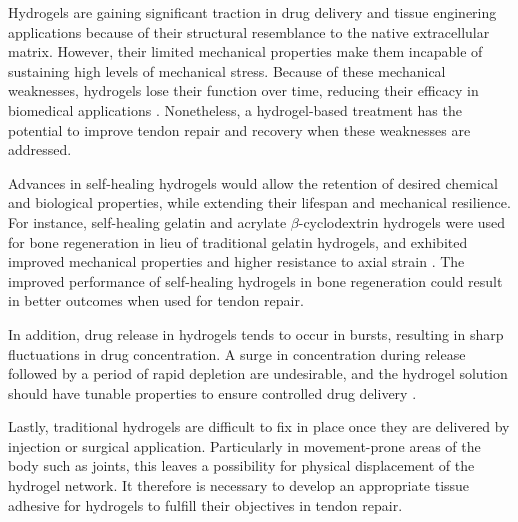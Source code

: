 Hydrogels are gaining significant traction in drug delivery and tissue enginering applications because of their structural resemblance to the native extracellular matrix. However, their limited mechanical properties make them incapable of sustaining high levels of mechanical stress.
Because of these mechanical weaknesses, hydrogels lose their function over time, reducing their efficacy in biomedical applications \autocite{rammalAdvancesBiomedicalApplications2021}. Nonetheless, a hydrogel-based treatment has the potential to improve tendon repair and recovery when these weaknesses are addressed.

Advances in self-healing hydrogels would allow the retention of desired chemical and biological properties, while extending their lifespan and mechanical resilience. For instance, self-healing gelatin and acrylate $\beta$-cyclodextrin hydrogels were used for bone regeneration in lieu of traditional gelatin hydrogels, and exhibited improved mechanical properties and higher resistance to axial strain \autocite{rammalAdvancesBiomedicalApplications2021}.
The improved performance of self-healing hydrogels in bone regeneration could result in better outcomes when used for tendon repair.

In addition, drug release in hydrogels tends to occur in bursts, resulting in sharp fluctuations in drug concentration. A surge in concentration during release followed by a period of rapid depletion are undesirable, and the hydrogel solution should have tunable properties to ensure controlled drug delivery \autocite{freedmanEnhancedTendonHealing2022}.

Lastly, traditional hydrogels are difficult to fix in place once they are delivered by injection or surgical application. Particularly in movement-prone areas of the body such as joints, this leaves a possibility for physical displacement of the hydrogel network. It therefore is necessary to develop an appropriate tissue adhesive for hydrogels to fulfill their objectives in tendon repair.